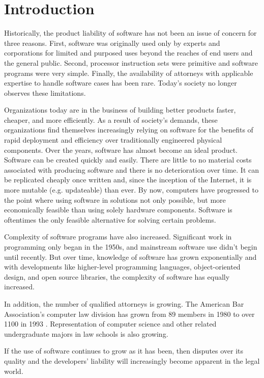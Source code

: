 \chapter{Introduction}

Historically, the product liability of software has not been an issue of
concern for three reasons. First, software was originally used only by experts
and corporations for limited and purposed uses beyond the reaches of end
users and the general public. Second, processor instruction sets were primitive
and software programs were very simple. Finally, the availability of attorneys
with applicable expertise to handle software cases has been rare. Today's
society no longer observes these limitations.

Organizations today are in the business of building better products faster,
cheaper, and more efficiently. As a result of society's demands, these
organizations find themselves increasingly relying on software for the benefits
of rapid deployment and efficiency over traditionally engineered physical
components. Over the years, software has almost become an ideal product.
Software can be created quickly and easily. There are little to no material
costs associated with producing software and there is no deterioration over
time. It can be replicated cheaply once written and, since the inception of the
Internet, it is more mutable (e.g. updateable) than ever. By now, computers
have progressed to the point where using software in solutions not only
possible, but more economically feasible than using solely hardware components.
Software is oftentimes the only feasible alternative for solving certain
problems.

Complexity of software programs have also increased. Significant work in
programming only began in the 1950s, and mainstream software use didn't begin
until recently. But over time, knowledge of software has grown exponentially
and with developments like higher-level programming languages, object-oriented
design, and open source libraries, the complexity of software has equally
increased.

In addition, the number of qualified attorneys is growing. The American Bar
Association's computer law division has grown from 89 members in 1980 to over
1100 in 1993 \cite{Armour93}. Representation of computer science and other related
undergraduate majors in law schools is also growing.

If the use of software continues to grow as it has been, then disputes over its
quality and the developers' liability will increasingly become apparent in the
legal world.

